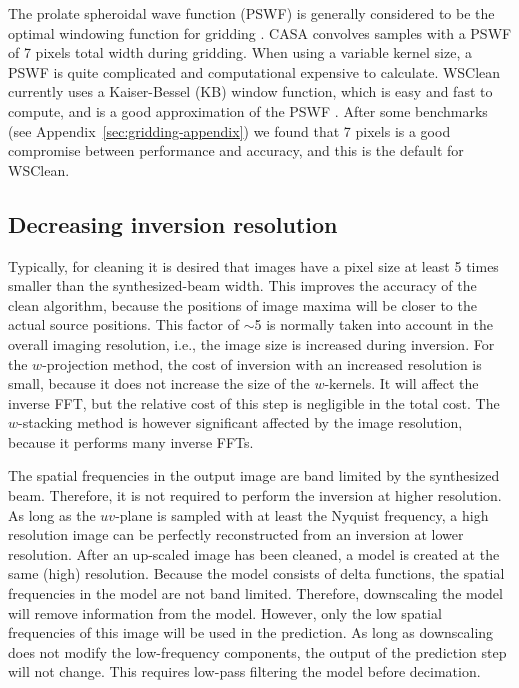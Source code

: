 \documentclass[useAMS,usenatbib]{mn2e}
\begin{document}
The prolate spheroidal wave function (PSWF) is generally considered to be the optimal windowing function for gridding \citep{fourier-kernel-selection-1991}. CASA convolves samples with a PSWF of 7 pixels total width during gridding. When using a variable kernel size, a PSWF is quite complicated and computational expensive to calculate. WSClean currently uses a Kaiser-Bessel (KB) window function, which is easy and fast to compute, and is a good approximation of the PSWF \citep{fourier-kernel-selection-1991}. After some benchmarks (see Appendix~\ref{sec:gridding-appendix}) we found that 7 pixels is a good compromise between performance and accuracy, and this is the default for WSClean.

\subsection{Decreasing inversion resolution} \label{sec:decreasing-inversion-resolution}
Typically, for cleaning it is desired that images have a pixel size at least 5 times smaller than the synthesized-beam width. This improves the accuracy of the clean algorithm, because the positions of image maxima will be closer to the actual source positions. This factor of $\sim$5 is normally taken into account in the overall imaging resolution, i.e., the image size is increased during inversion. For the $w$-projection method, the cost of inversion with an increased resolution is small, because it does not increase the size of the $w$-kernels. It will affect the inverse FFT, but the relative cost of this step is negligible in the total cost. The $w$-stacking method is however significant affected by the image resolution, because it performs many inverse FFTs.

The spatial frequencies in the output image are band limited by the synthesized beam. Therefore, it is not required to perform the inversion at higher resolution. As long as the $uv$-plane is sampled with at least the Nyquist frequency, a high resolution image can be perfectly reconstructed from an inversion at lower resolution. After an up-scaled image has been cleaned, a model is created at the same (high) resolution. Because the model consists of delta functions, the spatial frequencies in the model are not band limited. Therefore, downscaling the model will remove information from the model. However, only the low spatial frequencies of this image will be used in the prediction. As long as downscaling does not modify the low-frequency components, the output of the prediction step will not change. This requires low-pass filtering the model before decimation.
\end{document}
